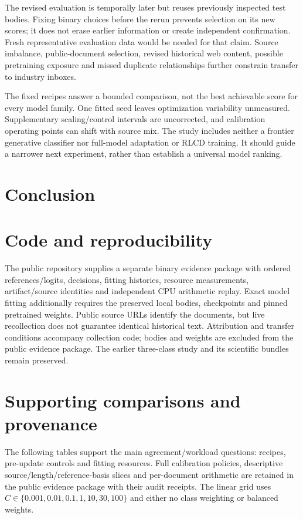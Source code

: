 \documentclass[11pt,a4paper]{article}
\begin{document}
The revised evaluation is temporally later but reuses previously inspected
test bodies. Fixing binary choices before the rerun prevents selection on its
new scores; it does not erase earlier information or create independent
confirmation. Fresh representative evaluation data would be needed for that
claim. Source imbalance, public-document selection, revised historical web
content, possible pretraining exposure and missed duplicate relationships
further constrain transfer to industry inboxes.

The fixed recipes answer a bounded comparison, not the best achievable score
for every model family. One fitted seed leaves optimization variability
unmeasured. Supplementary scaling/control intervals are uncorrected, and
calibration operating points can shift with source mix. The study includes
neither a frontier generative classifier nor full-model adaptation or RLCD
training. It should guide a narrower next experiment, rather than establish
a universal model ranking.

\section{Conclusion}


\section*{Code and reproducibility}
The public repository supplies a separate binary evidence package with ordered
references/logits, decisions, fitting histories, resource measurements,
artifact/source identities and independent CPU arithmetic replay. Exact model
fitting additionally requires the preserved local bodies, checkpoints and
pinned pretrained weights. Public source URLs identify the documents, but live
recollection does not guarantee identical historical text. Attribution and transfer conditions accompany collection
code; bodies and weights are excluded from the public evidence package.
The earlier three-class study and its scientific bundles remain preserved.


\FloatBarrier

\clearpage
\appendix
\section{Supporting comparisons and provenance}
\label{sec:supporting}
The following tables support the main agreement/workload questions: recipes,
pre-update controls and fitting resources. Full calibration policies,
descriptive source/length/reference-basis slices and per-document arithmetic
are retained in the public evidence package with their audit receipts.
The linear grid uses $C\in\{0.001,\allowbreak0.01,\allowbreak0.1,\allowbreak1,\allowbreak10,\allowbreak30,\allowbreak100\}$
and either no class weighting or balanced weights.

\end{document}

